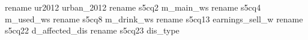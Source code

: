 rename ur2012   urban_2012
rename s5cq2    m_main_ws
rename s5cq4    m_used_ws
rename s5cq8    m_drink_ws
rename s5cq13   earnings_sell_w
rename s5cq22   d_affected_dis
rename s5cq23   dis_type
